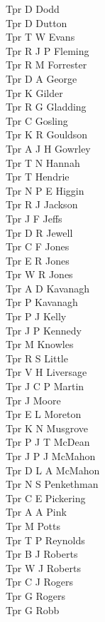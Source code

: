\begin{multicols}{2}
  Tpr D Dodd \\
  Tpr D Dutton \\
  Tpr T W Evans \\
  Tpr R J P Fleming \\
  Tpr R M Forrester \\
  Tpr D A George \\
  Tpr K Gilder \\
  Tpr R G Gladding \\
  Tpr C Gosling \\
  Tpr K R Gouldson \\
  Tpr A J H Gowrley \\
  Tpr T N Hannah \\
  Tpr T Hendrie \\
  Tpr N P E Higgin \\
  Tpr R J Jackson \\
  Tpr J F Jeffs \\
  Tpr D R Jewell \\
  Tpr C F Jones \\
  Tpr E R Jones \\
  Tpr W R Jones \\
  Tpr A D Kavanagh \\
  Tpr P Kavanagh \\
  Tpr P J Kelly \\
  Tpr J P Kennedy \\
  Tpr M Knowles \\
  Tpr R S Little \\
  Tpr V H Liversage \\
  Tpr J C P Martin \\
  Tpr J Moore \\
  Tpr E L Moreton \\
  Tpr K N Musgrove \\
  Tpr P J T McDean \\
  Tpr J P J McMahon \\
  Tpr D L A McMahon \\
  Tpr N S Penkethman \\
  Tpr C E Pickering \\
  Tpr A A Pink \\
  Tpr M Potts \\
  Tpr T P Reynolds \\
  Tpr B J Roberts \\
  Tpr W J Roberts \\
  Tpr C J Rogers \\
  Tpr G Rogers \\
  Tpr G Robb \\

\end{multicols}
